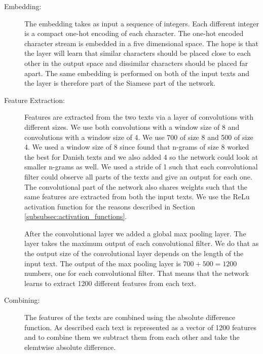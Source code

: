 \begin{description}

    \item[Embedding:]

        The embedding takes as input a sequence of integers. Each different
        integer is a compact one-hot encoding of each character. The one-hot
        encoded character stream is embedded in a five dimensional space. The
        hope is that the layer will learn that similar characters should be
        placed close to each other in the output space and dissimilar characters
        should be placed far apart. The same embedding is performed on both of
        the input texts and the layer is therefore part of the Siamese part of
        the network.

    \item[Feature Extraction:]

        Features are extracted from the two texts via a layer of convolutions
        with different sizes. We use both convolutions with a window size of
        8 and convolutions with a window size of 4. We use 700 of size 8 and
        500 of size 4. We used a window size of 8 since \cite{aalykke2016}
        found that n-grams of size 8 worked the best for Danish texts and we
        also added 4 so the network could look at smaller n-grams as well.
        We used a stride of 1 such that each convolutional filter could
        observe all parts of the texts and give an output for each one. The
        convolutional part of the network also shares weights such that the
        same features are extracted from both the input texts. We use the
        \gls{ReLu} activation function for the reasons described in Section
        \ref{subsubsec:activation_functions}.

        After the convolutional layer we added a global max pooling layer. The
        layer takes the maximum output of each convolutional filter. We do that
        as the output size of the convolutional layer depends on the length of
        the input text. The output of the max pooling layer is $700 + 500 =
        1200$ numbers, one for each convolutional filter. That means that the
        network learns to extract 1200 different features from each text.

    \item[Combining:]

        The features of the texts are combined using the absolute difference
        function. As described each text is represented as a vector of 1200
        features and to combine them we subtract them from each other and take
        the elemtwise absolute difference.


\end{description}

